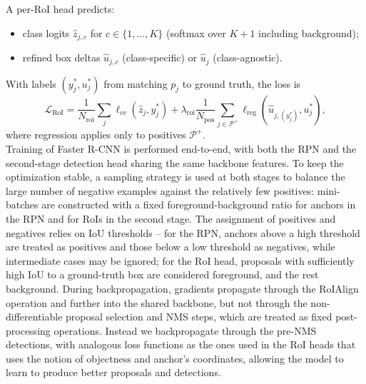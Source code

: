 A per-RoI head predicts:
\begin{itemize}
    \item class logits $\hat{z}_{j,c}$ for $c\in\{1,\dots,K\}$ (softmax over $K{+}1$ including background);
    \item refined box deltas $\hat{u}_{j,c}$ (class-specific) or $\hat{u}_j$ (class-agnostic).
\end{itemize}
With labels $(y_j^\ast, u_j^\ast)$ from matching $p_j$ to ground truth, the loss is
$$
\mathcal{L}_{\text{RoI}}
=\frac{1}{N_{\text{roi}}}\sum_{j}\ell_{\text{ce}}(\hat{z}_{j},y_j^\ast)
+\lambda_{\text{roi}}\frac{1}{N_{\text{pos}}}\sum_{j\in\mathcal{P}^+}\ell_{\text{reg}}(\hat{u}_{j,(y_j^\ast)},u_j^\ast),
$$
where regression applies only to positives $\mathcal{P}^+$.\\

Training of Faster R-CNN is performed end-to-end, with both the RPN and the second-stage detection head sharing the same backbone features. To keep the optimization stable, a sampling strategy is used at both stages to balance the large number of negative examples against the relatively few positives: mini-batches are constructed with a fixed foreground-background ratio for anchors in the RPN and for RoIs in the second stage. The assignment of positives and negatives relies on IoU thresholds -- for the RPN, anchors above a high threshold are treated as positives and those below a low threshold as negatives, while intermediate cases may be ignored; for the RoI head, proposals with sufficiently high IoU to a ground-truth box are considered foreground, and the rest background. During backpropagation, gradients propagate through the RoIAlign operation and further into the shared backbone, but not through the non-differentiable proposal selection and NMS steps, which are treated as fixed post-processing operations. Instead we backpropagate through the pre-NMS detections, with analogous loss functions as the ones used in the RoI heads that uses the notion of objectness and anchor's coordinates, allowing the model to learn to produce better proposals and detections.



